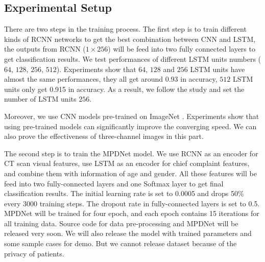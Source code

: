 \documentclass[journal]{IEEEtran}
\begin{document}
\subsection{Experimental Setup}
\label{experimentalsetup}
There are two steps in the training process.
The first step is to train different kinds of RCNN networks to get the best combination between CNN and LSTM, the outputs from RCNN ($1 \times 256$) will be feed into two fully connected layers to get classification results. 
We test performances of different LSTM units numbers ($64$, $128$, $256$, $512$). Experiments show that $64$, $128$ and $256$ LSTM units have almost the same performances, they all get around 0.93 in accuracy, $512$ LSTM units only get 0.915 in accuracy. As a result, we follow the study \cite{Donahue2015Long} and set the number of LSTM units $256$.

Moreover, we use CNN models pre-trained on ImageNet \cite{ILSVRC15}. Experiments show that using pre-trained models can significantly improve the converging speed. We can also prove the effectiveness of three-channel images in this part.

The second step is to train the MPDNet model. We use RCNN as an encoder for CT scan visual features, use LSTM as an encoder for chief complaint features, and combine them with information of age and gender. All these features will be feed into two fully-connected layers and one Softmax layer to get final classification results. The initial learning rate is set to 0.0005 and drops 50\% every 3000 training steps. The dropout rate in fully-connected layers is set to 0.5. MPDNet will be trained for four epoch, and each epoch contains 15 iterations for all training data.
Source code for data pre-processing and MPDNet will be released very soon. We will also release the model with trained parameters and some sample cases for demo. But we cannot release dataset because of the privacy of patients. 
\end{document}
